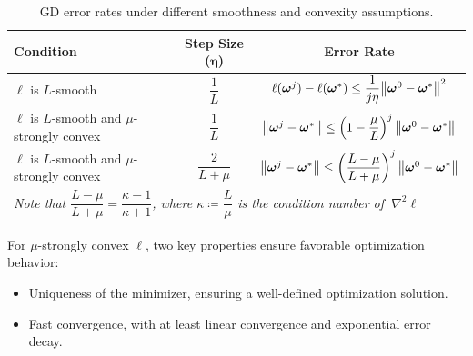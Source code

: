\begin{table}[!htpb]
    \centering
    \begin{tabular}{lcc}
        \toprule
        \textbf{Condition} & \textbf{Step Size ($\bm\eta$)} & \textbf{Error Rate} \\ 
        \midrule
        $\ell$ is $L$-smooth  & $\dfrac{1}{L}$  & $\ell(\bm\omega^{j}) - \ell(\bm\omega^{*}) \le \dfrac{1}{j\eta}\norm{\bm\omega^0 - \bm\omega^*}^2$  \\
        \midrule
        \makecell{$\ell$ is $L$-smooth and\\$\mu$-strongly convex}   & $\dfrac{1}{L}$ & $\norm{\bm\omega^{j} - \bm\omega^{*}} \le \left(1-\dfrac{\mu}{L}\right)^j\norm{\bm\omega^0 - \bm\omega^*}$  \\
        \midrule
        \makecell{$\ell$ is $L$-smooth and\\$\mu$-strongly convex}   & $\dfrac{2}{L+\mu}$   & $\norm{\bm\omega^{j} - \bm\omega^{*}} \le \left(\dfrac{L-\mu}{L+\mu}\right)^j\norm{\bm\omega^0 - \bm\omega^*}$  \\
        [1.5em]
        \multicolumn{3}{l}{\textit{Note that $\dfrac{L-\mu}{L+\mu}=\dfrac{\kappa-1}{\kappa+1}$, where $\kappa\coloneqq\dfrac{L}{\mu}$ is the condition number of $~\nabla^2\ell$}} \\
        \bottomrule
    \end{tabular}
    \caption{GD error rates under different smoothness and convexity assumptions.}
    \label{tab:table-01}
\end{table}

For $\mu$-strongly convex $\ell$, two key properties ensure favorable optimization behavior:
\begin{itemize}
    \item Uniqueness of the minimizer, ensuring a well-defined optimization solution.
    \item Fast convergence, with at least linear convergence and exponential error decay. 
\end{itemize}

